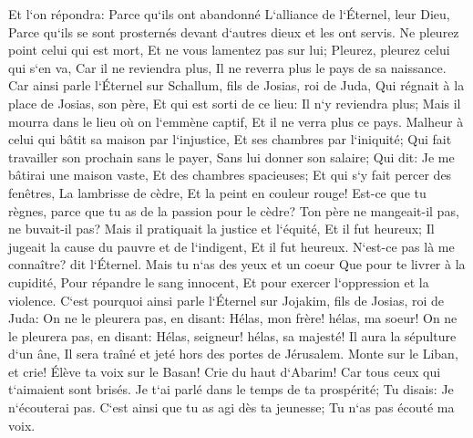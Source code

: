 \verse Et l`on répondra: Parce qu`ils ont abandonné L`alliance de l`Éternel, leur Dieu, Parce qu`ils se sont prosternés devant d`autres dieux et les ont servis. 
\verse Ne pleurez point celui qui est mort, Et ne vous lamentez pas sur lui; Pleurez, pleurez celui qui s`en va, Car il ne reviendra plus, Il ne reverra plus le pays de sa naissance. 
\verse Car ainsi parle l`Éternel sur Schallum, fils de Josias, roi de Juda, Qui régnait à la place de Josias, son père, Et qui est sorti de ce lieu: Il n`y reviendra plus; 
\verse Mais il mourra dans le lieu où on l`emmène captif, Et il ne verra plus ce pays. 
\verse Malheur à celui qui bâtit sa maison par l`injustice, Et ses chambres par l`iniquité; Qui fait travailler son prochain sans le payer, Sans lui donner son salaire; 
\verse Qui dit: Je me bâtirai une maison vaste, Et des chambres spacieuses; Et qui s`y fait percer des fenêtres, La lambrisse de cèdre, Et la peint en couleur rouge! 
\verse Est-ce que tu règnes, parce que tu as de la passion pour le cèdre? Ton père ne mangeait-il pas, ne buvait-il pas? Mais il pratiquait la justice et l`équité, Et il fut heureux; 
\verse Il jugeait la cause du pauvre et de l`indigent, Et il fut heureux. N`est-ce pas là me connaître? dit l`Éternel. 
\verse Mais tu n`as des yeux et un coeur Que pour te livrer à la cupidité, Pour répandre le sang innocent, Et pour exercer l`oppression et la violence. 
\verse C`est pourquoi ainsi parle l`Éternel sur Jojakim, fils de Josias, roi de Juda: On ne le pleurera pas, en disant: Hélas, mon frère! hélas, ma soeur! On ne le pleurera pas, en disant: Hélas, seigneur! hélas, sa majesté! 
\verse Il aura la sépulture d`un âne, Il sera traîné et jeté hors des portes de Jérusalem. 
\verse Monte sur le Liban, et crie! Élève ta voix sur le Basan! Crie du haut d`Abarim! Car tous ceux qui t`aimaient sont brisés. 
\verse Je t`ai parlé dans le temps de ta prospérité; Tu disais: Je n`écouterai pas. C`est ainsi que tu as agi dès ta jeunesse; Tu n`as pas écouté ma voix. 
